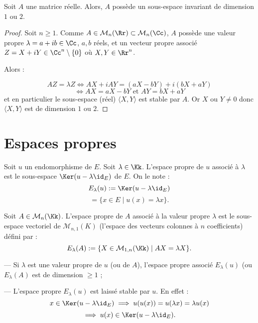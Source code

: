 \documentclass[class=report,crop=false]{standalone}
\begin{document}
\begin{corollaire}
Soit $A$ une matrice réelle. Alors, $A$ possède un sous-espace invariant de dimension $1$ ou $2$.
\end{corollaire}

\begin{proof}
Soit $n \ge 1$. Comme $A \in \mathcal{M}_n(\Rr) \subset \mathcal{M}_n(\Cc)$, $A$ possède une valeur propre $\lambda = a+ib \in \Cc$, $a,b$ réels, et un  vecteur propre associé $Z=X+iY \in\Cc^n \setminus\{0\}$ où $X,Y \in \Rr^n$. 

Alors :

\[A Z  = \lambda Z \iff AX + i AY = (aX -bY) + i (bX+aY)\]
\[\iff AX = aX-bY \text{ et } AY = bX +a Y\]
et en particulier le sous-espace (réel) $\langle X,Y \rangle$ est stable par $A$. Or $X$ ou $Y \neq 0$ donc $\langle X, Y \rangle$ est de dimension $1$ ou $2$. 
\end{proof}


\section{Espaces propres}

\begin{definition}
Soit $u$ un endomorphisme de $E$. Soit $\lambda \in \Kk$. L'espace propre de $u$   associé à $\lambda$ est le sous-espace $\Ker(u-\lambda \id_E)$ de $E$. On le note :
\[E_\lambda(u) := \Ker(u-\lambda \id_E)\]
\[= \{x \in E \mid u(x) = \lambda x\}.\]

Soit $A \in \mathcal{M}_n(\Kk)$. L'espace propre de $A$ associé à la valeur propre $\lambda$ est le sous-espace vectoriel de $\mathcal{M}_{n,1}(K)$ (l'espace des vecteurs colonnes à $n$ coefficients) défini par :
\[E_\lambda(A) := \{X \in {\cal M}_{1,n}(\Kk) \mid A X = \lambda X\} .\]
\end{definition}

\begin{remarque*}[s]

--- Si $\lambda$ est une valeur propre de $u$ (ou de $A$), l'espace propre associé $E_\lambda(u)$ (ou $E_\lambda(A)$ est de dimension $\ge 1$ ;

--- L'espace propre $E_\lambda(u)$ est laissé stable par  $u$. En effet :
\[x  \in \Ker (u-\lambda \id_E) \implies u(u(x)) = u(\lambda x) = \lambda u(x)\]
\[\implies u(x) \in \Ker (u-\lambda \id_E) .\]
\end{remarque*}
\end{document}

